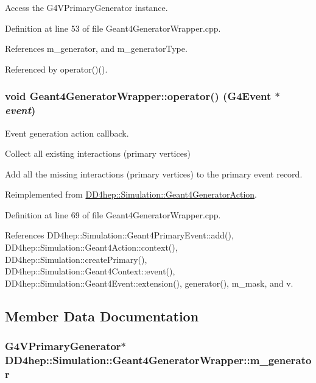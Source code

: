 Access the G4VPrimaryGenerator instance. 

Definition at line 53 of file Geant4GeneratorWrapper.cpp.

References m\_\-generator, and m\_\-generatorType.

Referenced by operator()().\hypertarget{class_d_d4hep_1_1_simulation_1_1_geant4_generator_wrapper_a073ee3177fe624c0caf2bb5068d9d865}{
\subsubsection[{operator()}]{\setlength{\rightskip}{0pt plus 5cm}void Geant4GeneratorWrapper::operator() (G4Event $\ast$ {\em event})}}
\label{class_d_d4hep_1_1_simulation_1_1_geant4_generator_wrapper_a073ee3177fe624c0caf2bb5068d9d865}


Event generation action callback. 

Collect all existing interactions (primary vertices)

Add all the missing interactions (primary vertices) to the primary event record. 

Reimplemented from \hyperlink{class_d_d4hep_1_1_simulation_1_1_geant4_generator_action_ac5a1d2335a19e3f9d555081199e01801}{DD4hep::Simulation::Geant4GeneratorAction}.

Definition at line 69 of file Geant4GeneratorWrapper.cpp.

References DD4hep::Simulation::Geant4PrimaryEvent::add(), DD4hep::Simulation::Geant4Action::context(), DD4hep::Simulation::createPrimary(), DD4hep::Simulation::Geant4Context::event(), DD4hep::Simulation::Geant4Event::extension(), generator(), m\_\-mask, and v.

\subsection{Member Data Documentation}
\hypertarget{class_d_d4hep_1_1_simulation_1_1_geant4_generator_wrapper_a53d604d0f487a3be2edbe9670d0d4f15}{
\subsubsection[{m\_\-generator}]{\setlength{\rightskip}{0pt plus 5cm}G4VPrimaryGenerator$\ast$ {\bf DD4hep::Simulation::Geant4GeneratorWrapper::m\_\-generator}}}
\label{class_d_d4hep_1_1_simulation_1_1_geant4_generator_wrapper_a53d604d0f487a3be2edbe9670d0d4f15}


